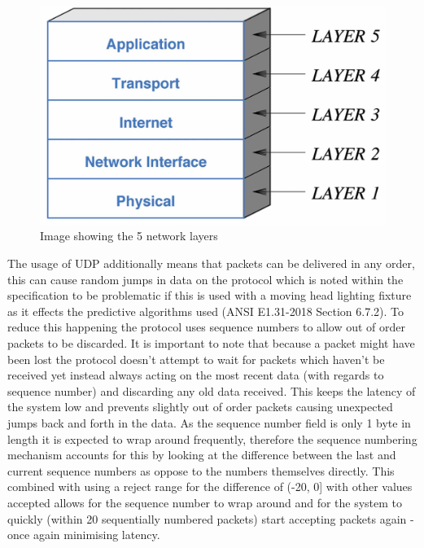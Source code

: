 \documentclass[11pt,a4paper]{report}
\begin{document}
\begin{figure}[H]
\label{NET_STACK}
\includegraphics[width=\textwidth]{net_stack}
\caption{Image showing the 5 network layers}
\end{figure}

The usage of UDP additionally means that packets can be delivered in any order, this can cause random jumps in data on the protocol which is noted within the specification to be problematic if this is used with a moving head lighting fixture as it effects the predictive algorithms used (ANSI E1.31-2018 Section 6.7.2). To reduce this happening the protocol uses sequence numbers to allow out of order packets to be discarded. It is important to note that because a packet might have been lost the protocol doesn't attempt to wait for packets which haven't be received yet instead always acting on the most recent data (with regards to sequence number) and discarding any old data received. This keeps the latency of the system low and prevents slightly out of order packets causing unexpected jumps back and forth in the data. As the sequence number field is only 1 byte in length it is expected to wrap around frequently, therefore the sequence numbering mechanism accounts for this by looking at the difference between the last and current sequence numbers as oppose to the numbers themselves directly. This combined with using a reject range for the difference of (-20, 0] with other values accepted allows for the sequence number to wrap around and for the system to quickly (within 20 sequentially numbered packets) start accepting packets again - once again minimising latency. 
\end{document}
